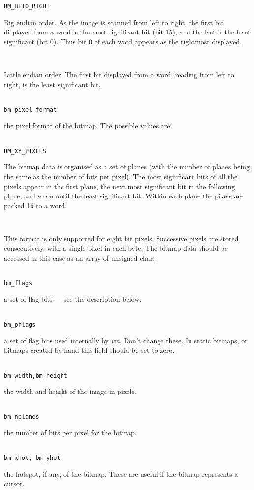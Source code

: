 \begin{tabbing}
\> {\tt BM\_BIT0\_RIGHT} \>
\parbox[t]{3.5in}{Big endian order. As the image is scanned from left to right,
the first bit displayed from a word is
the most significant bit (bit 15),
and the last is the least significant (bit 0).
Thus bit 0 of each word appears as the rightmost displayed.} \\[0.1in]

 \>
\parbox[t]{3.5in}{Little endian order.
The first bit displayed from a word, reading from left to right,
is the least significant bit.} \\[0.1in]

{\tt bm\_pixel\_format} \>
\parbox[t]{4.5in}{the pixel format of the bitmap.
The possible values are:} \\[0.1in]

\> {\tt BM\_XY\_PIXELS} \>
\parbox[t]{3.5in}{The bitmap data is organised as a set of planes (with the number of
planes being the same as the number of bits per pixel).
The most significant bits of all the pixels appear in the first plane,
the next most significant bit in the following plane, and so on until
the least significant bit.
Within each plane the pixels are packed 16 to a word. }\\[0.1in]

 \>
\parbox[t]{3.5in}{This format is only supported for eight bit pixels.
Successive pixels are stored consecutively, with a single pixel in
each byte.
The bitmap data should be accessed in this case as an array of unsigned char.}\\[0.1in]

{\tt bm\_flags} \>
\parbox[t]{4.75in}{a set of flag bits --- see the description below. }\\[0.1in]

{\tt bm\_pflags} \>
\parbox[t]{4.75in}{a set of flag bits used internally by {\em wn}.
Don't change these.  In static bitmaps, or bitmaps created by
hand this field should be set to zero.}\\[0.1in]

{\tt bm\_width,bm\_height} \>
\parbox[t]{4.75in}{the width and height of the image in pixels. }\\[0.1in]

{\tt bm\_nplanes} \>
\parbox[t]{4.75in}{the number of bits per pixel for the bitmap. }\\[0.1in]

{\tt bm\_xhot, bm\_yhot} \>
\parbox[t]{4.75in}{the hotspot, if any, of the bitmap.
These are useful if the bitmap represents a cursor. }\\[0.1in]


\end{tabbing}
